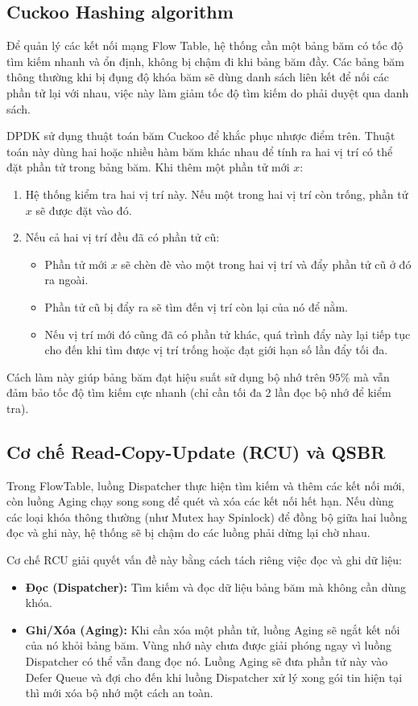 \documentclass[12pt,a4paper,twoside]{report}
\begin{document}
\subsection{Cuckoo Hashing algorithm}
Để quản lý các kết nối mạng Flow Table, hệ thống cần một bảng băm có tốc độ tìm kiếm nhanh và ổn định, không bị chậm đi khi bảng băm đầy. Các bảng băm thông thường khi bị đụng độ khóa băm sẽ dùng danh sách liên kết để nối các phần tử lại với nhau, việc này làm giảm tốc độ tìm kiếm do phải duyệt qua danh sách.

DPDK sử dụng thuật toán băm Cuckoo để khắc phục nhược điểm trên. Thuật toán này dùng hai hoặc nhiều hàm băm khác nhau để tính ra hai vị trí có thể đặt phần tử trong bảng băm. Khi thêm một phần tử mới $x$:
\begin{enumerate}
    \item Hệ thống kiểm tra hai vị trí này. Nếu một trong hai vị trí còn trống, phần tử $x$ sẽ được đặt vào đó.
    \item Nếu cả hai vị trí đều đã có phần tử cũ:
    \begin{itemize}
        \item Phần tử mới $x$ sẽ chèn đè vào một trong hai vị trí và đẩy phần tử cũ ở đó ra ngoài.
        \item Phần tử cũ bị đẩy ra sẽ tìm đến vị trí còn lại của nó để nằm.
        \item Nếu vị trí mới đó cũng đã có phần tử khác, quá trình đẩy này lại tiếp tục cho đến khi tìm được vị trí trống hoặc đạt giới hạn số lần đẩy tối đa.
    \end{itemize}
\end{enumerate}

Cách làm này giúp bảng băm đạt hiệu suất sử dụng bộ nhớ trên $95\%$ mà vẫn đảm bảo tốc độ tìm kiếm cực nhanh (chỉ cần tối đa 2 lần đọc bộ nhớ để kiểm tra).

\subsection{Cơ chế Read-Copy-Update (RCU) và QSBR}
Trong FlowTable, luồng Dispatcher thực hiện tìm kiếm và thêm các kết nối mới, còn luồng Aging chạy song song để quét và xóa các kết nối hết hạn. Nếu dùng các loại khóa thông thường (như Mutex hay Spinlock) để đồng bộ giữa hai luồng đọc và ghi này, hệ thống sẽ bị chậm do các luồng phải dừng lại chờ nhau.

Cơ chế RCU giải quyết vấn đề này bằng cách tách riêng việc đọc và ghi dữ liệu:
\begin{itemize}
    \item \textbf{Đọc (Dispatcher):} Tìm kiếm và đọc dữ liệu bảng băm mà không cần dùng khóa.
    \item \textbf{Ghi/Xóa (Aging):} Khi cần xóa một phần tử, luồng Aging sẽ ngắt kết nối của nó khỏi bảng băm. Vùng nhớ này chưa được giải phóng ngay vì luồng Dispatcher có thể vẫn đang đọc nó. Luồng Aging sẽ đưa phần tử này vào Defer Queue và đợi cho đến khi luồng Dispatcher xử lý xong gói tin hiện tại thì mới xóa bộ nhớ một cách an toàn.
\end{itemize}
\end{document}
